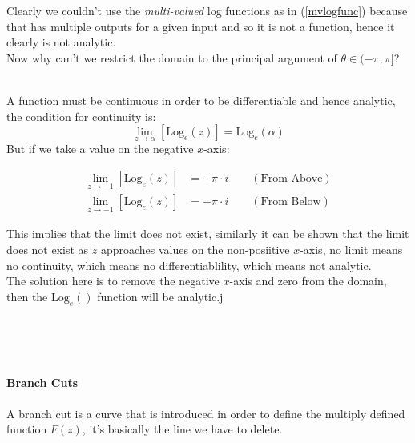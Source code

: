 \documentclass[class=article, crop=false]{standalone}
\begin{document}
 \hfill\begin{minipage}{\dimexpr\textwidth-3cm}
   Clearly we couldn't use the \textit{multi-valued} log functions as in (\ref{mvlogfunc}) because that has multiple outputs for a given input and so it is not a function, hence it clearly is not analytic.\\

   Now why can't we restrict the domain to the principal argument of $\theta \in (-\pi, \pi]$?\\

   \ \

   \hfill\begin{minipage}{\dimexpr\textwidth-3cm}
   A function must be continuous in order to be differentiable and hence analytic, the condition for continuity is:\\
   \[
   \lim_{z     \rightarrow \alpha}\left[ \mathrm{Log}_e{\left( z \right) } \right] = \mathrm{Log}_e{\left( \alpha \right) }
   \]
But if we take a value on the negative $x$-axis:

\begin{align*}
    \lim_{z     \rightarrow -1}\left[ \mathrm{Log}_e{\left( z \right) } \right] &= + \pi \cdot i  \qquad \left( \text{From Above} \right) \\
    \lim_{z     \rightarrow -1}\left[ \mathrm{Log}_e{\left( z \right) } \right] &= -  \pi \cdot i  \qquad \left( \text{From Below} \right)
\end{align*}

This implies that the limit does not exist, similarly it can be shown that the limit does not exist as $z$ approaches values on the non-posiitive $x$-axis, no limit means no continuity, which  means no differentiablility, which means not analytic.\\

The solution here is to remove the negative $x$-axis and zero from the domain, then the $\mathrm{Log}_e{\left(  \right) }$ function will be analytic.j
\ \\





   \end{minipage}
   \ \


 \end{minipage}
 \ \



\newpage



\paragraph{Branch Cuts}
A branch cut is a curve that is introduced in order to define the multiply defined function $F\left( z \right) $, it's basically the line we have to delete.\\
\end{document}

